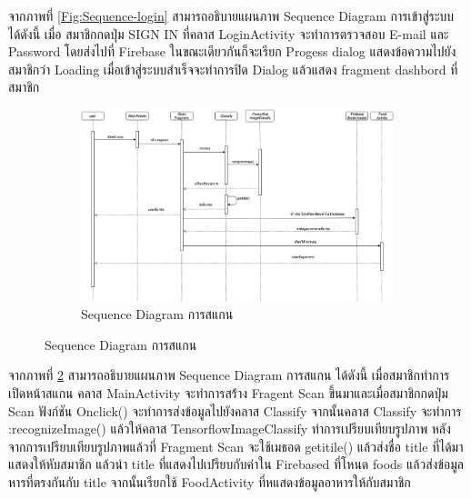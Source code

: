		\label{Fig:Sequence-login}
		จากภาพที่ \ref{Fig:Sequence-login} สามารถอธิบายแผนภาพ Sequence Diagram การเข้าสู่ระบบ ได้ดังนี้ เมื่อ
	สมาชิกกดปุ่ม SIGN IN  ที่คลาส LoginActivity จะทำการตรวจสอบ E-mail และ Password โดยส่งไปที่ Firebase ในขณะเดียวกันก็จะเรียก Progess dialog แสดงข้อความไปยังสมาชิกว่า Loading 
	 เมื่อเข้าสู่ระบบสำเร็จจะทำการปิด Dialog แล้วแสดง fragment dashbord ที่สมาชิก
	\begin{figure}
	\begin{figure}[H]
		\centering
		\includegraphics[width=0.8\columnwidth]
		{Figures/3/Sequence/sqscannew1.png}
		\caption{Sequence Diagram การสแกน}
		\label{Fig:Sequence-scan}
	\end{figure}
	\end{figure}
	\newpage
	จากภาพที่ \ref{Fig:Sequence-scan} สามารถอธิบายแผนภาพ Sequence Diagram การสแกน ได้ดังนี้ เมื่อสมาชิกทำการเปิดหน้าสแกน คลาส MainActivity จะทำการสร้่าง Fragent Scan ขึ้นมาและเมื่อสมาชิกกดปุ่ม Scan ฟังก์ชัน Onclick() จะทำการส่งข้อมูลไปยังคลาส Classify จากนั้นคลาส Classify 
	จะทำการ :recognizeImage() แล้วให้คลาส TensorflowImageClassify ทำการเปรียบเทียบรูปภาพ หลังจากการเปรียบเทียบรูปภาพแล้วที่ Fragment Scan จะใช้เมธอด getitile() แล้วส่งชื่อ title ที่ได้มาแสดงให้หับสมาชิก แล้วนำ title ที่แสดงไปเปรียบกับค่าใน Firebased ที่โหนด foods แล้วส่งข้อมูลหารที่ตรงกันกับ title 
	จากนั้นเรียกใช้ FoodActivity ที่หแสดงข้อมูลอาหารให้กับสมาชิก
 
